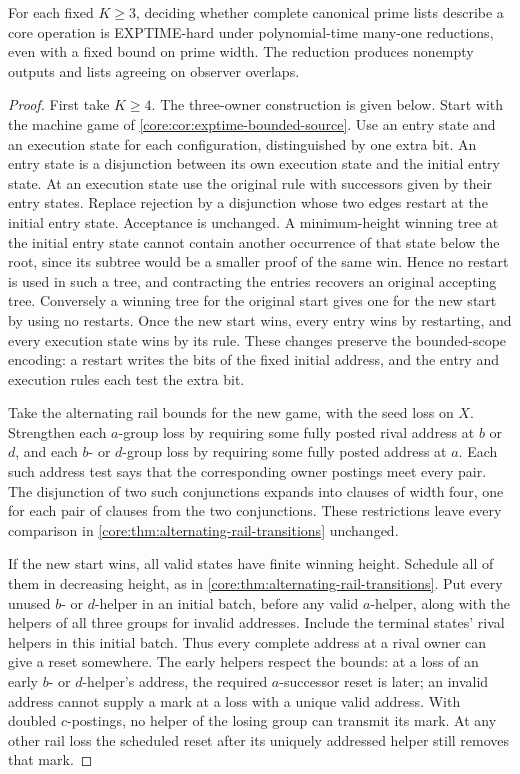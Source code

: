 \begin{theorem}
\label{core:thm:exptime-complete-guards}
For each fixed $K\ge3$, deciding whether complete canonical prime
lists describe a core operation is EXPTIME-hard under polynomial-time
many-one reductions, even with a fixed bound on prime width. The
reduction produces nonempty outputs and lists agreeing on observer
overlaps.
\end{theorem}
\begin{proof}
First take $K\ge4$. The three-owner construction is given below.
Start with the machine game of \cref{core:cor:exptime-bounded-source}.
Use an entry state and an execution state for each configuration,
distinguished by one extra bit. An entry state is a disjunction
between its own execution state and the initial entry state. At an
execution state use the original rule with successors given by
their entry states. Replace rejection by a disjunction whose two
edges restart at the initial entry state. Acceptance is unchanged.
A minimum-height winning tree at the initial entry state cannot
contain another occurrence of that state below the root, since its
subtree would be a smaller proof of the same win. Hence no restart
is used in such a tree, and contracting the entries recovers an
original accepting tree. Conversely a winning tree for the original
start gives one for the new start by using no restarts. Once the
new start wins, every entry wins by restarting, and every execution
state wins by its rule. These changes preserve the bounded-scope
encoding: a restart writes the bits of the fixed initial address,
and the entry and execution rules each test the extra bit.

Take the alternating rail bounds for the new game, with the seed
loss on $X$. Strengthen each $a$-group loss by requiring some fully
posted rival address at $b$ or $d$, and each $b$- or $d$-group
loss by requiring some fully posted address at $a$. Each such
address test says that the corresponding owner postings meet
every pair. The disjunction of two such conjunctions expands
into clauses of width four, one for each pair of clauses from
the two conjunctions. These restrictions leave every comparison
in \cref{core:thm:alternating-rail-transitions} unchanged.

If the new start wins, all valid states have finite winning height.
Schedule all of them in decreasing height, as in
\cref{core:thm:alternating-rail-transitions}. Put every unused
$b$- or $d$-helper in an initial batch, before any valid
$a$-helper, along with the helpers of all three groups for
invalid addresses. Include the terminal states' rival helpers
in this initial batch. Thus every complete address at a rival
owner can give a reset somewhere. The early helpers respect the
bounds: at a loss of an early $b$- or $d$-helper's address,
the required $a$-successor reset is later; an invalid address
cannot supply a mark at a loss with a unique valid address.
With doubled $c$-postings, no helper of the losing group can
transmit its mark. At any other rail loss the scheduled reset
after its uniquely addressed helper still removes that mark.


\end{proof}
